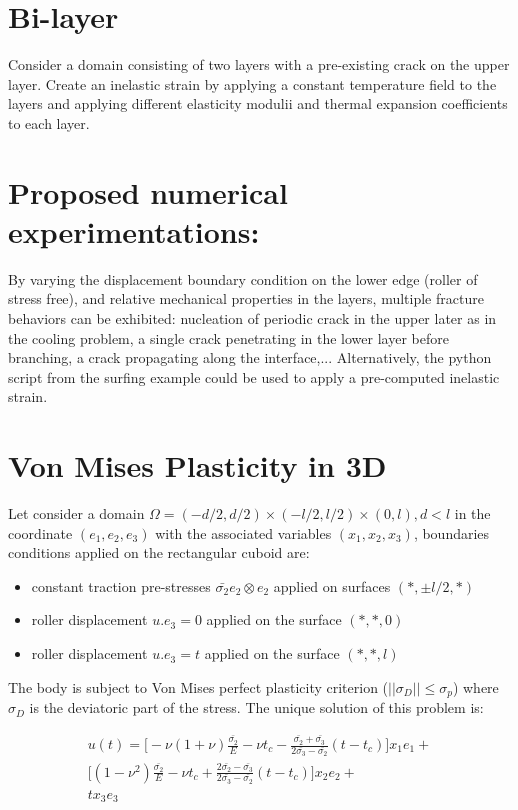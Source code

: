 \documentclass[10pt,oneside]{report}
\begin{document}
\section{Bi-layer}
Consider a domain consisting of two layers with a pre-existing crack on the upper layer. Create an inelastic strain by applying a constant temperature field to the layers and applying different elasticity modulii and thermal expansion coefficients to each layer.

\section*{Proposed numerical experimentations:}
By varying the displacement boundary condition on the lower edge (roller of stress free), and relative mechanical properties in the layers, multiple fracture behaviors can be exhibited: nucleation of periodic crack in the upper later as in the cooling problem, a single crack penetrating in the lower layer before branching, a crack propagating along the interface,...
Alternatively, the python script from the surfing example could be used to apply a pre-computed inelastic strain.

\section{Von Mises Plasticity in 3D}
Let consider a domain $\Omega= (-d/2,d/2) \times (-l/2,l/2) \times (0,l), d<l$ in the coordinate $(e_1, e_2, e_3)$ with the associated variables $(x_1, x_2, x_3)$, boundaries conditions applied on the rectangular cuboid are:
\begin{itemize}
\item constant traction pre-stresses $\bar{\sigma_2} e_2 \otimes e_2$ applied on surfaces $(*, \pm l/2,*)$
\item roller displacement $u.e_3 = 0$ applied on the surface $(*,*,0)$
\item roller displacement $u.e_3 = t$ applied on the surface $(*,*,l)$
\end{itemize}

The body is subject to Von Mises perfect plasticity criterion ($||\sigma_D|| \leq \sigma_p$) where $\sigma_D$ is the deviatoric part of the stress. The unique solution of this problem is:

\begin{equation}
\begin{split}
\label{eq:UsolVonMises3D}
u(t)= \Big[ -\nu(1+\nu)\frac{\bar{\sigma_2}}{E} -\nu t_c - \frac{\bar{\sigma_2}+\bar{\sigma_3}}{2\bar{\sigma_3}-\bar{\sigma_2}} (t-t_c)\Big]x_1 e_1+\\
	\Big[ (1-\nu^2)\frac{\bar{\sigma_2}}{E} - \nu t_c + \frac{2\bar{\sigma_2}-\bar{\sigma_3}}{2\bar{\sigma_3}-\bar{\sigma_2}}(t-t_c) \Big] x_2 e_2 + \\
	t x_3 e_3
\end{split}
\end{equation}
\end{document}
